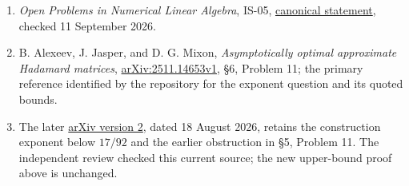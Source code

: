 \documentclass[10pt,a4paper]{article}
\begin{document}
\begin{enumerate}
\def\labelenumi{\arabic{enumi}.}
\item
  \emph{Open Problems in Numerical Linear Algebra}, IS-05,
  \href{https://github.com/ajt60gaibb/OpenProblemsInNLA/blob/main/eigenvalues-and-inverse-problems/IS-05/README.md}{canonical
  statement}, checked 11 September 2026.
\item
  B. Alexeev, J. Jasper, and D. G. Mixon, \emph{Asymptotically optimal
  approximate Hadamard matrices},
  \href{https://arxiv.org/html/2511.14653v1}{arXiv:2511.14653v1}, §6,
  Problem 11; the primary reference identified by the repository for the
  exponent question and its quoted bounds.
\item
  The later \href{https://arxiv.org/html/2511.14653v2}{arXiv version 2},
  dated 18 August 2026, retains the construction exponent below
  \(17/92\) and the earlier obstruction in §5, Problem 11. The
  independent review checked this current source; the new upper-bound
  proof above is unchanged.
\end{enumerate}
\end{document}
